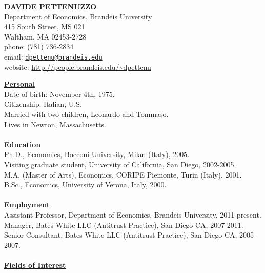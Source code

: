 \documentclass[12pt]{article}
\begin{document}
\begin{center}
\textbf{DAVIDE PETTENUZZO} \\
Department of Economics, Brandeis University \\
415 South Street, MS 021 \\
Waltham, MA 02453-2728 \\
phone: (781) 736-2834 \\
email: \href{mailto:dpettenu@brandeis.edu}{\nolinkurl{dpettenu@brandeis.edu}} \\
website: \url{http://people.brandeis.edu/~dpettenu} \\
\end{center}
\hline 
\bigskip

\underline{\textbf{Personal}}\\
Date of birth: November 4th, 1975. \\
Citizenship: Italian, U.S. \\
Married with two children, Leonardo and Tommaso. \\
Lives in Newton, Massachusetts. \\ \\ 
\underline{\textbf{Education}}\\
Ph.D., Economics, Bocconi University, Milan (Italy), 2005.\\
Visiting graduate student, University of California, San Diego, 2002-2005. \\
M.A. (Master of Arts), Economics, CORIPE Piemonte, Turin (Italy), 2001. \\
B.Sc., Economics, University of Verona, Italy, 2000.\\ \\
\underline{\textbf{Employment}}\\
Assistant Professor, Department of Economics, Brandeis University, 2011-present.\\
Manager, Bates White LLC (Antitrust Practice), San Diego CA, 2007-2011.\\
Senior Consultant, Bates White LLC (Antitrust Practice), San Diego CA, 2005-2007. \\ \\
\underline{\textbf{Fields of Interest}}\\
\end{document}
